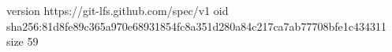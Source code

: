 version https://git-lfs.github.com/spec/v1
oid sha256:81d8fe89c365a970e68931854fc8a351d280a84c217ca7ab77708bfe1c434311
size 59
